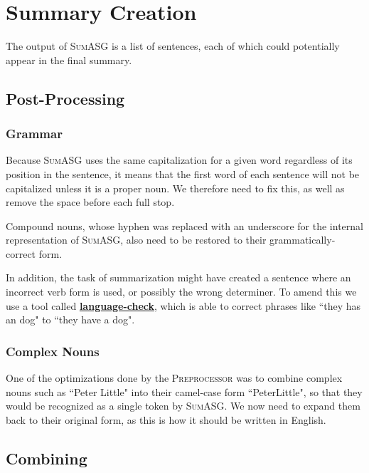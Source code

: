 \section{Summary Creation}
\label{sec:summary_creation}

The output of \textsc{SumASG} is a list of sentences, each of which could potentially appear in the final summary.

\subsection{Post-Processing}

\subsubsection{Grammar}

Because \textsc{SumASG} uses the same capitalization for a given word regardless of its position in the sentence, it means that the first word of each sentence will not be capitalized unless it is a proper noun. We therefore need to fix this, as well as remove the space before each full stop.

Compound nouns, whose hyphen was replaced with an underscore for the internal representation of \textsc{SumASG}, also need to be restored to their grammatically-correct form.

In addition, the task of summarization might have created a sentence where an incorrect verb form is used, or possibly the wrong determiner. To amend this we use a tool called \textbf{\href{https://pypi.org/project/language-check/}{language-check}}, which is able to correct phrases like ``they has an dog" to ``they have a dog".

\subsubsection{Complex Nouns}

One of the optimizations done by the \textsc{Preprocessor} was to combine complex nouns such as ``Peter Little" into their camel-case form ``PeterLittle", so that they would be recognized as a single token by \textsc{SumASG}. We now need to expand them back to their original form, as this is how it should be written in English.

\subsection{Combining}

